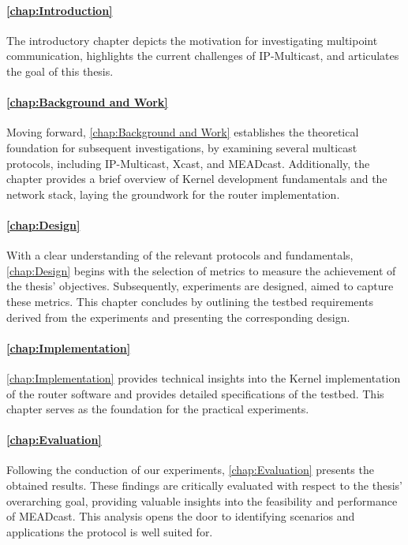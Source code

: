 \paragraph{\autoref{chap:Introduction}} %
\label{par:Intro_Structure_Introduction}
The introductory chapter depicts the motivation for investigating multipoint
    communication, highlights the current challenges of IP-Multicast, and
    articulates the goal of this thesis.

\paragraph{\autoref{chap:Background and Work}} %
\label{par:Intro_Structure_Background Work}
Moving forward, \autoref{chap:Background and Work} establishes the theoretical
    foundation for subsequent investigations, by examining several multicast
    protocols, including IP-Multicast, Xcast, and MEADcast.
Additionally, the chapter provides a brief overview of Kernel development
    fundamentals and the network stack, laying the groundwork for the router
    implementation.

\paragraph{\autoref{chap:Design}} %
\label{par:Intro_Structure_Design}
With a clear understanding of the relevant protocols and fundamentals,
    \autoref{chap:Design} begins with the selection of metrics to measure the
    achievement of the thesis' objectives.
Subsequently, experiments are designed, aimed to capture these metrics.
This chapter concludes by outlining the testbed requirements derived from the 
    experiments and presenting the corresponding design.

\paragraph{\autoref{chap:Implementation}} %
\label{par:Intro_Structure_Implementation}
\autoref{chap:Implementation} provides technical insights into the Kernel
    implementation of the router software and provides detailed specifications
    of the testbed.
This chapter serves as the foundation for the practical experiments.

\paragraph{\autoref{chap:Evaluation}} %
\label{par:Intro_Structure_Evaluation}
Following the conduction of our experiments, \autoref{chap:Evaluation} presents
    the obtained results. 
These findings are critically evaluated with respect to the thesis' overarching
    goal, providing valuable insights into the feasibility and performance of
    MEADcast.
This analysis opens the door to identifying scenarios and applications the
    protocol is well suited for.

